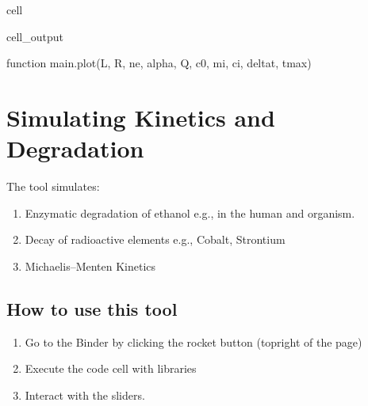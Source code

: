 \documentclass[letterpaper,10pt,english]{jupyterBook}
\begin{document}
\begin{sphinxuseclass}{cell}
\begin{sphinxVerbatimOutput}
\begin{sphinxuseclass}{cell_output}
\begin{sphinxVerbatim}[commandchars=\\\{\}]
\PYGZlt{}function \PYGZus{}\PYGZus{}main\PYGZus{}\PYGZus{}.plot(L, R, ne, alpha, Q, c0, mi, ci, delta\PYGZus{}t, t\PYGZus{}max)\PYGZgt{}
\end{sphinxVerbatim}

\end{sphinxuseclass}\end{sphinxVerbatimOutput}

\end{sphinxuseclass}
\sphinxstepscope


\chapter{Simulating Kinetics and Degradation}
\label{\detokenize{content/tools/Kinetics_degradation:simulating-kinetics-and-degradation}}\label{\detokenize{content/tools/Kinetics_degradation::doc}}
\sphinxAtStartPar
The tool simulates:
\begin{enumerate}
%
\item {} 
\sphinxAtStartPar
Enzymatic degradation of ethanol e.g., in the human and organism.

\item {} 
\sphinxAtStartPar
Decay of radioactive elements e.g., Cobalt, Strontium

\item {} 
\sphinxAtStartPar
Michaelis–Menten Kinetics

\end{enumerate}


\section{How to use this tool}
\label{\detokenize{content/tools/Kinetics_degradation:how-to-use-this-tool}}\begin{enumerate}
%
\item {} 
\sphinxAtStartPar
Go to the Binder by clicking the rocket button (top\sphinxhyphen{}right of the page)

\item {} 
\sphinxAtStartPar
Execute the code cell with libraries

\item {} 
\sphinxAtStartPar
Interact with the sliders.

\end{enumerate}
\end{document}
